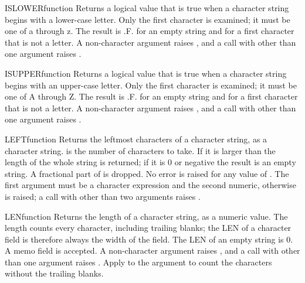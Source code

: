 \begin{XbaseEntry}{ISLOWER}{function}
Returns a logical value that is true when a character string begins with a lower-case letter.
\Syntax
{}
\Usage
Only the first character is examined; it must be one of a through z. The result is .F. for an empty string and for a first character that is not a letter. A non-character argument raises , and a call with other than one argument raises .
\Examples
{}
\end{XbaseEntry}

\begin{XbaseEntry}{ISUPPER}{function}
Returns a logical value that is true when a character string begins with an upper-case letter.
\Syntax
{}
\Usage
Only the first character is examined; it must be one of A through Z. The result is .F. for an empty string and for a first character that is not a letter. A non-character argument raises , and a call with other than one argument raises .
\Examples
{}
\end{XbaseEntry}

\begin{XbaseEntry}{LEFT}{function}
Returns the leftmost characters of a character string, as a character string.
\Syntax
{}
\Usage
{} is the number of characters to take. If it is larger than the length of  the whole string is returned; if it is 0 or negative the result is an empty string. A fractional part of  is dropped. No error is raised for any value of . The first argument must be a character expression and the second numeric, otherwise  is raised; a call with other than two arguments raises .
\Examples
{}
\end{XbaseEntry}

\begin{XbaseEntry}{LEN}{function}
Returns the length of a character string, as a numeric value.
\Syntax
{}
\Usage
The length counts every character, including trailing blanks; the LEN of a character field is therefore always the width of the field. The LEN of an empty string is 0. A memo field is accepted. A non-character argument raises , and a call with other than one argument raises .
\Tips
Apply  to the argument to count the characters without the trailing blanks.
\Examples
{}
\end{XbaseEntry}

